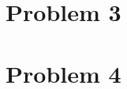 \documentclass[11pt]{article}
\begin{document}
\section*{Problem 3}
\section*{Problem 4}
%
% 
% 
\end{document}
